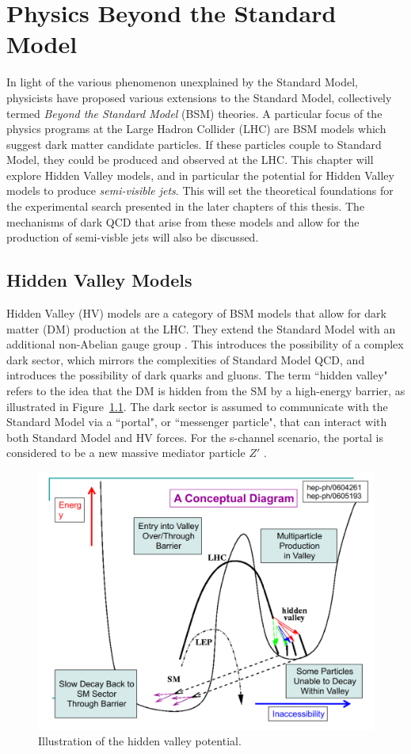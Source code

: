 \chapter{Physics Beyond the Standard Model}
\label{ch:theory}
In light of the various phenomenon unexplained by the Standard Model, physicists have proposed various extensions to the Standard Model, collectively termed \textit{Beyond the Standard Model} (BSM) theories. 
A particular focus of the physics programs at the Large Hadron Collider (LHC) are BSM models which suggest dark matter candidate particles. If these particles couple to Standard Model, they could be produced and observed at the LHC.
This chapter will explore Hidden Valley models, and in particular the potential for Hidden Valley models to produce \textit{semi-visible jets}. This will set the theoretical foundations for the experimental search presented in the later chapters of this thesis. The mechanisms of dark QCD that arise from these models and allow for the production of semi-visble jets will also be discussed.

\section{Hidden Valley Models}
\label{sec:hiddenvalley}

Hidden Valley (HV) models are a category of BSM models that allow for dark matter (DM) production at the LHC. They extend the Standard Model with an additional non-Abelian gauge group \cite{snowmass}. This introduces the possibility of a complex dark sector, which mirrors the complexities of Standard Model QCD, and introduces the possibility of dark quarks and gluons. The term ``hidden valley" refers to the idea that the DM is hidden from the SM by a high-energy barrier, as illustrated in Figure~\ref{fig:hidden_valley_sketch}. The dark sector is assumed to communicate with the Standard Model via a ``portal", or ``messenger particle", that can interact with both Standard Model and HV forces. For the s-channel scenario, the portal is considered to be a new massive mediator particle $Z'$ . \par

\begin{figure}[h]
        \centering
	\includegraphics[width=.5\textwidth]{figures/ch2/hidden_valley_sketch.png}
         \caption{Illustration of the hidden valley potential.
         \label{fig:hidden_valley_sketch}}
\end{figure}

